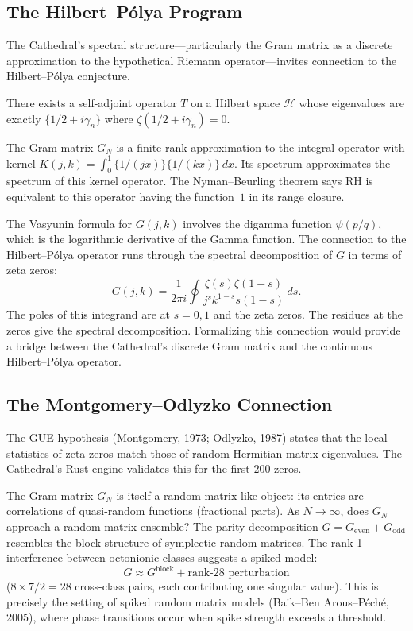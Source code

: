 \documentclass[11pt,a4paper]{article}
\begin{document}
\subsection{The Hilbert--P\'olya Program}

The Cathedral's spectral structure---particularly the Gram matrix as a
discrete approximation to the hypothetical Riemann operator---invites
connection to the Hilbert--P\'olya conjecture.

\begin{conjecture}
There exists a self-adjoint operator $T$ on a Hilbert space $\mathcal{H}$
whose eigenvalues are exactly $\{1/2 + i\gamma_n\}$ where
$\zeta(1/2 + i\gamma_n) = 0$.
\end{conjecture}

The Gram matrix $G_N$ is a finite-rank approximation to the integral
operator with kernel $K(j,k) = \int_0^1 \{1/(jx)\}\{1/(kx)\}\,dx$.
Its spectrum approximates the spectrum of this kernel operator. The
Nyman--Beurling theorem says RH is equivalent to this operator having
the function~$1$ in its range closure.

\begin{direction}
The Vasyunin formula for $G(j,k)$ involves the digamma function
$\psi(p/q)$, which is the logarithmic derivative of the Gamma function.
The connection to the Hilbert--P\'olya operator runs through the
spectral decomposition of $G$ in terms of zeta zeros:
\[
  G(j,k) = \frac{1}{2\pi i} \oint \frac{\zeta(s)\zeta(1-s)}{j^s k^{1-s} s(1-s)}\,ds.
\]
The poles of this integrand are at $s = 0, 1$ and the zeta zeros.
The residues at the zeros give the spectral decomposition. Formalizing
this connection would provide a bridge between the Cathedral's discrete
Gram matrix and the continuous Hilbert--P\'olya operator.
\end{direction}

\subsection{The Montgomery--Odlyzko Connection}

The GUE hypothesis (Montgomery, 1973; Odlyzko, 1987) states that the
local statistics of zeta zeros match those of random Hermitian matrix
eigenvalues. The Cathedral's Rust engine validates this for the first
200 zeros.

\begin{direction}
The Gram matrix $G_N$ is itself a random-matrix-like object: its entries
are correlations of quasi-random functions (fractional parts). As $N \to
\infty$, does $G_N$ approach a random matrix ensemble? The parity
decomposition $G = G_{\mathrm{even}} + G_{\mathrm{odd}}$ resembles the
block structure of symplectic random matrices. The rank-1 interference
between octonionic classes suggests a spiked model:
\[
  G \approx G^{\mathrm{block}} + \text{rank-28 perturbation}
\]
($8 \times 7 / 2 = 28$ cross-class pairs, each contributing one singular
value). This is precisely the setting of spiked random matrix models
(Baik--Ben Arous--P\'ech\'e, 2005), where phase transitions occur
when spike strength exceeds a threshold.
\end{direction}
\end{document}
